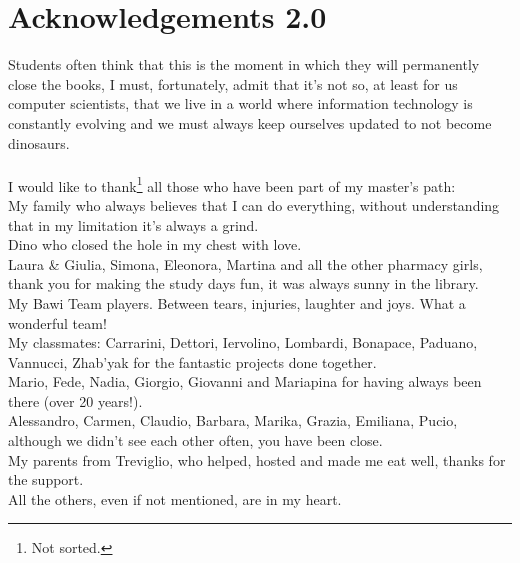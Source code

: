 \chapter*{Acknowledgements 2.0}

Students often think that this is the moment in which they will permanently close the books, I must, fortunately, admit that it's not so, at least for us computer scientists, that we live in a world where information technology is constantly evolving and we must always keep ourselves updated to not become dinosaurs.\\
\\
I would like to thank\footnote{Not sorted.} all those who have been part of my master's path:\\
My family who always believes that I can do everything, without understanding that in my limitation it's always a grind.\\
Dino who closed the hole in my chest with love.\\
Laura \& Giulia, Simona, Eleonora, Martina and all the other pharmacy girls, thank you for making the study days fun, it was always sunny in the library.\\
My Bawi Team players. Between tears, injuries, laughter and joys. What a wonderful team!\\
My classmates: Carrarini, Dettori, Iervolino, Lombardi, Bonapace, Paduano, Vannucci, Zhab'yak for the fantastic projects done together.\\
Mario, Fede, Nadia, Giorgio, Giovanni and Mariapina for having always been there (over 20 years!).\\
Alessandro, Carmen, Claudio, Barbara, Marika, Grazia, Emiliana, Pucio, although we didn't see each other often, you have been close.\\
My parents from Treviglio, who helped, hosted and made me eat well, thanks for the support.\\
All the others, even if not mentioned, are in my heart.